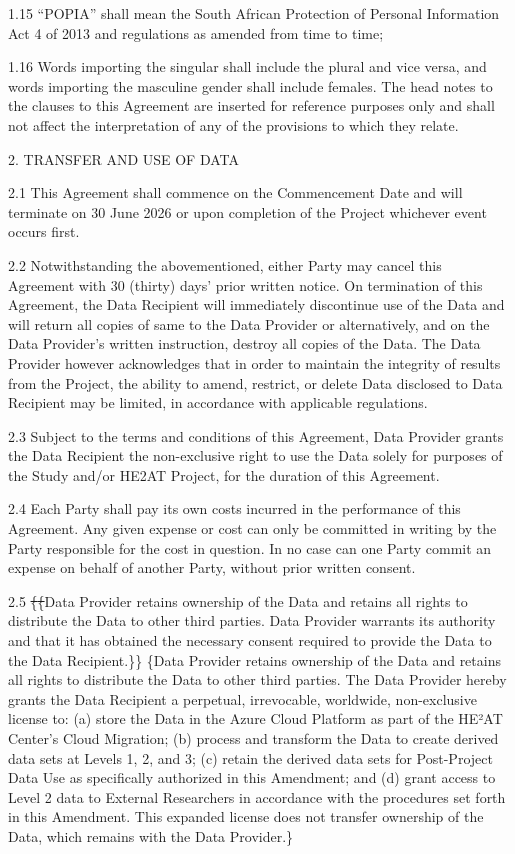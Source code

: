 \documentclass[12pt,letterpaper]{article}
\newcommand{\deleted}[1]{\textcolor{deletecolor}{\sout{#1}}}
\newcommand{\added}[1]{\textcolor{addcolor}{#1}}
\begin{document}
1.15	“POPIA” shall mean the South African Protection of Personal Information Act 4 of 2013 and regulations as amended from time to time;

1.16	Words importing the singular shall include the plural and vice versa, and words importing the masculine gender shall include females. The head notes to the clauses to this Agreement are inserted for reference purposes only and shall not affect the interpretation of any of the provisions to which they relate.

2.	TRANSFER AND USE OF DATA

2.1	This Agreement shall commence on the Commencement Date and will terminate on                      30 June 2026 or upon completion of the Project whichever event occurs first.

2.2	Notwithstanding the abovementioned, either Party may cancel this Agreement with 30 (thirty) days’ prior written notice.  On termination of this Agreement, the Data Recipient will immediately discontinue use of the Data and will return all copies of same to the Data Provider or alternatively, and on the Data Provider’s written instruction, destroy all copies of the Data. The Data Provider however acknowledges that in order to maintain the integrity of results from the Project, the ability to amend, restrict, or delete Data disclosed to Data Recipient may be limited, in accordance with applicable regulations.

2.3	Subject to the terms and conditions of this Agreement, Data Provider grants the Data Recipient the non-exclusive right to use the Data solely for purposes of the Study and/or HE2AT Project, for the duration of this Agreement. 

2.4	Each Party shall pay its own costs incurred in the performance of this Agreement. Any given expense or cost can only be committed in writing by the Party responsible for the cost in question. In no case can one Party commit an expense on behalf of another Party, without prior written consent.

2.5	\deleted\{\deleted\{Data Provider retains ownership of the Data and retains all rights to distribute the Data to other third parties. Data Provider warrants its authority and that it has obtained the necessary consent required to provide the Data to the Data Recipient.\}\} \added\{Data Provider retains ownership of the Data and retains all rights to distribute the Data to other third parties. The Data Provider hereby grants the Data Recipient a perpetual, irrevocable, worldwide, non-exclusive license to: (a) store the Data in the Azure Cloud Platform as part of the HE²AT Center's Cloud Migration; (b) process and transform the Data to create derived data sets at Levels 1, 2, and 3; (c) retain the derived data sets for Post-Project Data Use as specifically authorized in this Amendment; and (d) grant access to Level 2 data to External Researchers in accordance with the procedures set forth in this Amendment. This expanded license does not transfer ownership of the Data, which remains with the Data Provider.\}
\end{document}

